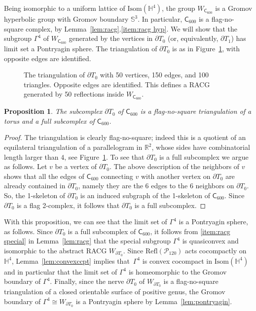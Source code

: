 \documentclass{amsart}
\theoremstyle{plain}
\newtheorem{proposition}[theorem]{Proposition}
\theoremstyle{definition}
\theoremstyle{remark}
\numberwithin{equation}{section}
\newcommand{\rr}{\mathbb R}
\newcommand{\hh}{\mathbb H}
\newcommand{\six}{\mathsf{C}_{600}}
\newcommand{\ttop}{T_{1}}
\newcommand{\tbtm}{T_{0}}
\newcommand{\Sb}{\mathbb{S}}
\begin{document}
Being isomorphic to a uniform lattice of $\mathrm{Isom} (\hh^4)$, the group $W_{\six}$ is a Gromov hyperbolic group with Gromov boundary $\Sb^3$. In particular, $\six$ is a flag-no-square complex, by Lemma~\ref{lem:racg}.\eqref{item:racg hyp}. We will show that the subgroup $\Gamma^4$ of $W_{\six}$ generated by the vertices in $\partial \tbtm$ (or, equivalently, $\partial \ttop$) has limit set a Pontryagin sphere. The triangulation of $\partial \tbtm$ is as in Figure~\ref{fig:h4}, with opposite edges are identified.
\begin{figure}[ht]
\centering
\def\svgwidth{.75\columnwidth}
  
\caption{The triangulation of $\partial \tbtm$ with 50 vertices, 150 edges, and 100 triangles. Opposite edges are identified. This defines a RACG generated by 50 reflections inside $W_{\six}$.} 
\label{fig:h4}
\end{figure}


\begin{proposition}
The subcomplex $\partial \tbtm$ of $\six$ is a flag-no-square triangulation of a torus and a full subcomplex of $\six$.
\end{proposition}

\begin{proof}
The triangulation is clearly flag-no-square; indeed this is a quotient of an equilateral triangulation of a parallelogram in $\rr^2$, whose sides have combinatorial length larger than $4$, see Figure~\ref{fig:h4}.
To see that $\partial \tbtm$ is a full subcomplex we argue as follows.
Let $v$ be a vertex of $\partial \tbtm$. 
The above description of the neighbors of $v$ shows that all the edges of $\six$ connecting $v$ with another vertex on $\partial \tbtm$ are already contained in $\partial \tbtm$, namely they are the 6 edges to the 6 neighbors on $\partial \tbtm$. 
So, the 1-skeleton of $\partial \tbtm$ is an induced subgraph of the 1-skeleton of $\six$.
Since $\partial \tbtm$ is a flag 2-complex, it follows that $\partial \tbtm$ is a full subcomplex.
\end{proof}


With this proposition, we can see that the limit set of $\Gamma^4$ is a Pontryagin sphere, as follows. 
Since $\partial \tbtm$ is a full subcomplex of $\six$, 
it follows from \eqref{item:racg special} in Lemma~\ref{lem:racg}
that the special subgroup $\Gamma^4$ is quasiconvex and isomorphic to the abstract RACG $W_{\partial \tbtm}$.
Since $\mathrm{Refl}(\mathcal{P}_{120})$ acts cocompactly on $\hh^4$, Lemma~\ref{lem:convexccpt} implies that~$\Gamma^4$ is convex cocompact in $\mathrm{Isom}(\hh^4)$ and in particular that the limit set of $\Gamma^4$ is homeomorphic to the Gromov boundary of $\Gamma^4$.
Finally,  since the nerve $\partial \tbtm$ of $W_{\partial \tbtm}$ is a flag-no-square triangulation of a closed orientable surface of positive genus, the Gromov boundary of $\Gamma^4 \cong W_{\partial \tbtm}$ is a Pontryagin sphere by Lemma~\ref{lem:pontryagin}.
\end{document}
